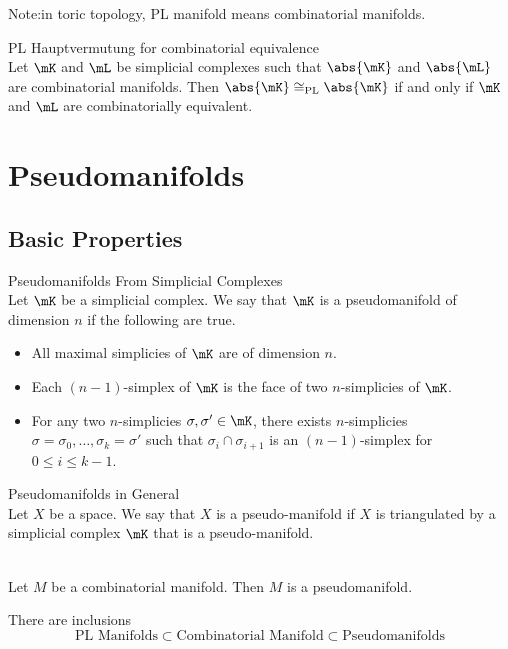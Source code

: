 \documentclass[a4paper]{article}
\begin{document}
Note:in toric topology, PL manifold means combinatorial manifolds. 

\begin{thm}{PL Hauptvermutung for combinatorial equivalence}{}\\
Let $\mK$ and $\mL$ be simplicial complexes such that $\abs{\mK}$ and $\abs{\mL}$ are combinatorial manifolds. Then $\abs{\mK}\cong_\text{PL}\abs{\mK}$ if and only if $\mK$ and $\mL$ are combinatorially equivalent. 
\end{thm}

\pagebreak
\section{Pseudomanifolds}
\subsection{Basic Properties}
\begin{defn}{Pseudomanifolds From Simplicial Complexes}{}\\
Let $\mK$ be a simplicial complex. We say that $\mK$ is a pseudomanifold of dimension $n$ if the following are true. 
\begin{itemize}
\item All maximal simplicies of $\mK$ are of dimension $n$. 
\item Each $(n-1)$-simplex of $\mK$ is the face of two $n$-simplicies of $\mK$. 
\item For any two $n$-simplicies $\sigma,\sigma'\in\mK$, there exists $n$-simplicies $\sigma=\sigma_0,\dots,\sigma_k=\sigma'$ such that $\sigma_i\cap\sigma_{i+1}$ is an $(n-1)$-simplex for $0\leq i\leq k-1$. 
\end{itemize}
\end{defn}

\begin{defn}{Pseudomanifolds in General}{}\\
Let $X$ be a space. We say that $X$ is a pseudo-manifold if $X$ is triangulated by a simplicial complex $\mK$ that is a pseudo-manifold. 
\end{defn}

\begin{prp}{}{}\\
Let $M$ be a combinatorial manifold. Then $M$ is a pseudomanifold. 
\end{prp}

There are inclusions $$\text{PL Manifolds}\subset\text{Combinatorial Manifold}\subset\text{Pseudomanifolds}$$
\end{document}
